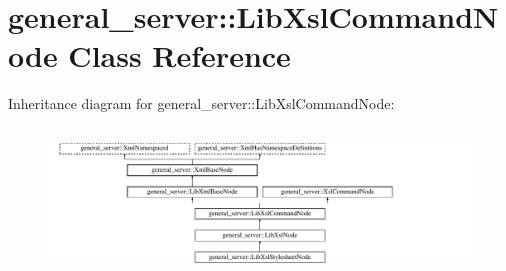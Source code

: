 \hypertarget{classgeneral__server_1_1LibXslCommandNode}{\section{general\-\_\-server\-:\-:\-Lib\-Xsl\-Command\-Node \-Class \-Reference}
\label{classgeneral__server_1_1LibXslCommandNode}
}
\-Inheritance diagram for general\-\_\-server\-:\-:\-Lib\-Xsl\-Command\-Node\-:\begin{figure}[H]
\begin{center}
\leavevmode
\includegraphics[height=3.985765cm]{classgeneral__server_1_1LibXslCommandNode}
\end{center}
\end{figure}

